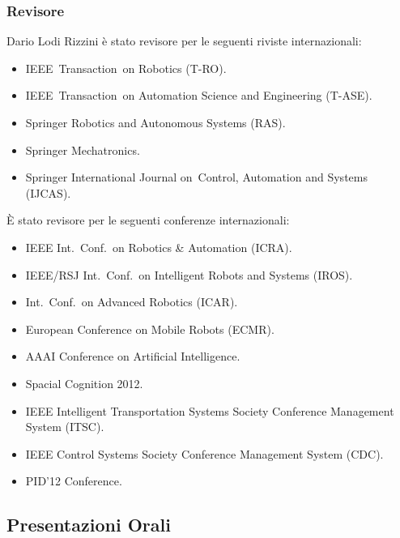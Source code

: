 \documentclass[11pt]{article}
\begin{document}
\subsubsection*{Revisore}

Dario Lodi Rizzini \`e stato revisore per le seguenti riviste internazionali:
\begin{itemize}
\item IEEE~Transaction~on Robotics (T-RO).
\item IEEE~Transaction~on Automation Science and Engineering (T-ASE).
\item Springer Robotics and Autonomous Systems (RAS).
\item Springer Mechatronics.
\item Springer International Journal on~Control, Automation and Systems (IJCAS).
\end{itemize}

\noindent \`E stato revisore per le seguenti conferenze internazionali:
\begin{itemize}
\item IEEE Int.~Conf.~on Robotics \& Automation (ICRA).
\item IEEE/RSJ Int.~Conf.~on Intelligent Robots and Systems (IROS).
\item Int.~Conf.~on Advanced Robotics (ICAR).
\item European Conference on Mobile Robots (ECMR).
\item AAAI Conference on Artificial Intelligence. 
\item Spacial Cognition 2012.
\item IEEE Intelligent Transportation Systems Society Conference Management System (ITSC).
\item IEEE Control Systems Society Conference Management System (CDC).
\item PID'12 Conference.
\end{itemize}

\subsection*{Presentazioni Orali}
\end{document}
